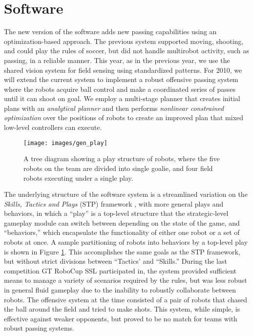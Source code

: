 
\section{Software}
The new version of the software adds new passing capabilities using an optimization-based approach. The previous system supported moving, shooting, and could play the rules of soccer, but did not handle multirobot activity, such as passing, in a reliable manner. This year, as in the previous year, we use the shared vision system for field sensing using standardized patterns.  For 2010, we will extend the current system to implement a robust offensive passing system where the robots acquire ball control and make a coordinated series of passes until it can shoot on goal. We employ a multi-stage planner that creates initial plans with an \textit{analytical planner} and then performs \textit{nonlinear constrained optimization} over the positions of robots to create an improved plan that mixed low-level controllers can execute.  

\begin{figure}
  \centering
  \vspace {0 cm}
  \texttt{[image: images/gen\_play]}
  \caption{A tree diagram showing a play structure of robots, where the five robots on the team are divided into single goalie, and four field robots executing under a single play.}
  \label{fig:play_structure}
\end{figure}

The underlying structure of the software system is a streamlined variation on the \textit{Skills, Tactics and Plays} (STP) framework \cite{browning2005stp}, with more general plays and behaviors, in which a ``play'' is a top-level structure that the strategic-level gameplay module can switch between depending on the state of the game, and ``behaviors,'' which encapsulate the functionality of either one robot or a set of robots at once. A sample partitioning of robots into behaviors by a top-level play is shown in Figure \ref{fig:play_structure}. This accomplishes the same goals as the STP framework, but without strict divisions between ``Tactics' and ``Skills.'' During the last competition GT RoboCup SSL participated in, the system provided sufficient means to manage a variety of scenarios required by the rules, but was less robust in general fluid gameplay due to the inability to robustly collaborate between robots.  The offensive system at the time consisted of a pair of robots that chased the ball around the field and tried to make shots.  This system, while simple, is effective against weaker opponents, but proved to be no match for teams with robust passing systems.  

